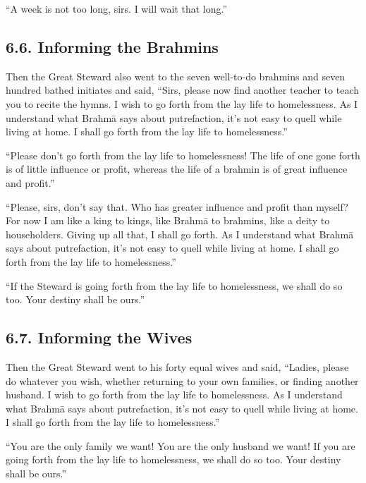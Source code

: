 \documentclass[12pt,openany]{book}%
\begin{document}
“A week is not too long, sirs. I will wait that long.” 

\subsection*{6.6. Informing the Brahmins }

Then the Great Steward also went to the seven well-to-do brahmins and seven hundred bathed initiates and said, “Sirs, please now find another teacher to teach you to recite the hymns. I wish to go forth from the lay life to homelessness. As I understand what \textsanskrit{Brahmā} says about putrefaction, it’s not easy to quell while living at home. I shall go forth from the lay life to homelessness.” 

“Please don’t go forth from the lay life to homelessness! The life of one gone forth is of little influence or profit, whereas the life of a brahmin is of great influence and profit.” 

“Please, sirs, don’t say that. Who has greater influence and profit than myself? For now I am like a king to kings, like \textsanskrit{Brahmā} to brahmins, like a deity to householders. Giving up all that, I shall go forth. As I understand what \textsanskrit{Brahmā} says about putrefaction, it’s not easy to quell while living at home. I shall go forth from the lay life to homelessness.” 

“If the Steward is going forth from the lay life to homelessness, we shall do so too. Your destiny shall be ours.” 

\subsection*{6.7. Informing the Wives }

Then the Great Steward went to his forty equal wives and said, “Ladies, please do whatever you wish, whether returning to your own families, or finding another husband. I wish to go forth from the lay life to homelessness. As I understand what \textsanskrit{Brahmā} says about putrefaction, it’s not easy to quell while living at home. I shall go forth from the lay life to homelessness.” 

“You are the only family we want! You are the only husband we want! If you are going forth from the lay life to homelessness, we shall do so too. Your destiny shall be ours.” 
\end{document}
